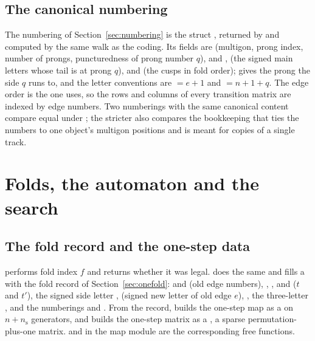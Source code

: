 \documentclass[12pt]{amsart}
\theoremstyle{plain}
\theoremstyle{definition}
\begin{document}
\subsection{The canonical numbering}
\label{sec:impl-numbering}
The numbering of Section~\ref{sec:numbering} is the struct
, returned by  and
computed by the same walk as the coding.  Its fields are
 (multigon, prong index, number of prongs, puncturedness
of prong number $q$),  and ,
 (the signed main letters whose tail is at prong
$q$), and  (the cusps in fold order);  gives
the prong the side $q$ runs to, and the letter conventions are
${}=e+1$ and ${}=n+1+q$.  The
edge order is the one  uses, so the rows and columns of
every transition matrix are indexed by edge numbers.  Two numberings with
the same canonical content compare equal under ; the
stricter  also compares the bookkeeping that ties the
numbers to one object's multigon positions and is meant for copies of a
single track.

\section{Folds, the automaton and the search}
\label{sec:impl-fold}

\subsection{The fold record and the one-step data}
 performs fold index $f$ and returns whether it
was legal.   does the same and
fills a  with the fold record of
Section~\ref{sec:onefold}:  and  (old edge
numbers), , ,  and
 ($t$ and $t'$), the signed side letter ,
 (signed new letter of old edge $e$),
, the three-letter , and the
numberings  and .  From the record,
 builds the one-step map as a 
on $n+n_{\mathrm{s}}$ generators, and  builds
the one-step matrix as a , a sparse
permutation-plus-one matrix.   and
 in the map module are the corresponding
free functions.
\end{document}
